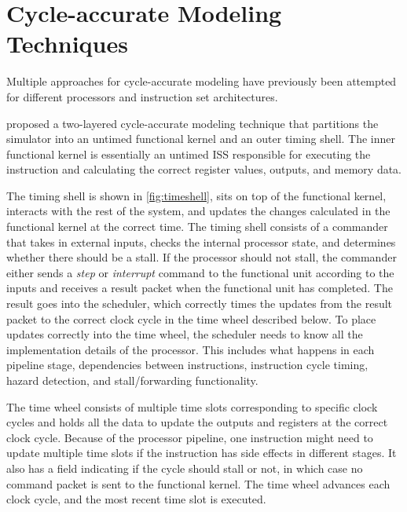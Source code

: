 
\section{Cycle-accurate Modeling Techniques}
\label{sec:bg_cycle-accurate}

Multiple approaches for cycle-accurate modeling have previously been attempted for different processors and instruction set architectures.

\textcite{chiangEfficientTwolayeredCycleaccurate2009} proposed a two-layered cycle-accurate modeling technique that partitions the simulator into an untimed functional kernel and an outer timing shell. The inner functional kernel is essentially an untimed ISS responsible for executing the instruction and calculating the correct register values, outputs, and memory data.

The timing shell is shown in \cref{fig:timeshell}, sits on top of the functional kernel, interacts with the rest of the system, and updates the changes calculated in the functional kernel at the correct time. The timing shell consists of a commander that takes in external inputs, checks the internal processor state, and determines whether there should be a stall. If the processor should not stall, the commander either sends a \textit{step} or \textit{interrupt} command to the functional unit according to the inputs and receives a result packet when the functional unit has completed. The result goes into the scheduler, which correctly times the updates from the result packet to the correct clock cycle in the time wheel described below. To place updates correctly into the time wheel, the scheduler needs to know all the implementation details of the processor. This includes what happens in each pipeline stage, dependencies between instructions, instruction cycle timing, hazard detection, and stall/forwarding functionality. 

The time wheel consists of multiple time slots corresponding to specific clock cycles and holds all the data to update the outputs and registers at the correct clock cycle. Because of the processor pipeline, one instruction might need to update multiple time slots if the instruction has side effects in different stages. It also has a field indicating if the cycle should stall or not, in which case no command packet is sent to the functional kernel. The time wheel advances each clock cycle, and the most recent time slot is executed.

